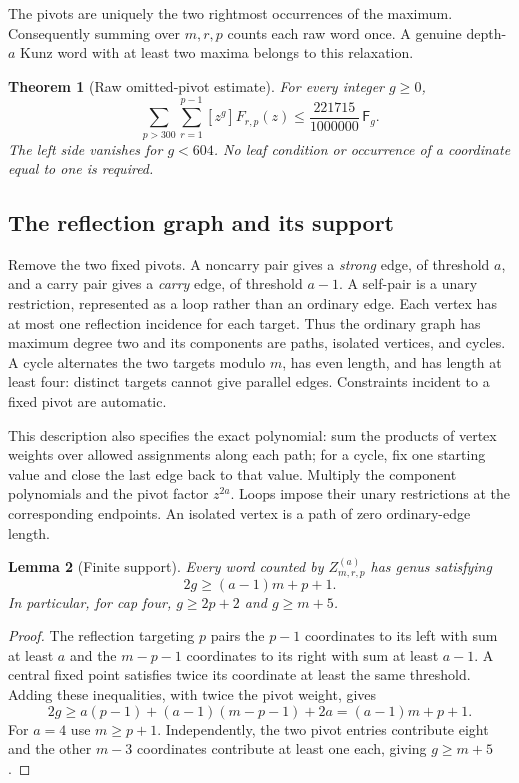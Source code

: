 \documentclass[11pt]{amsart}
\newtheorem{theorem}{Theorem}[section]
\newtheorem{lemma}[theorem]{Lemma}
\theoremstyle{definition}
\theoremstyle{remark}
\newcommand{\Fib}{\mathsf F}
\numberwithin{equation}{section}
\begin{document}
The pivots are uniquely the two rightmost occurrences of the maximum.
Consequently summing over $m,r,p$ counts each raw word once.  A genuine
depth-$a$ Kunz word with at least two maxima belongs to this relaxation.

\begin{theorem}[Raw omitted-pivot estimate]\label{raw:tail}
For every integer $g\ge0$,
\begin{equation}\label{raw:main}
 \sum_{p>300}\sum_{r=1}^{p-1}[z^g]F_{r,p}(z)
 \le \frac{221715}{1000000}\,\Fib_g.
\end{equation}
The left side vanishes for $g<604$.  No leaf condition or occurrence of a
coordinate equal to one is required.
\end{theorem}

\subsection{The reflection graph and its support}

Remove the two fixed pivots.  A noncarry pair gives a \emph{strong} edge,
of threshold $a$, and a carry pair gives a \emph{carry} edge, of threshold
$a-1$.  A self-pair is a unary restriction, represented as a loop rather
than an ordinary edge.  Each vertex has at most one reflection incidence
for each target.  Thus the ordinary graph has maximum degree two and its
components are paths, isolated vertices, and cycles.  A cycle alternates
the two targets modulo $m$, has even length, and has length at least four:
distinct targets cannot give parallel edges.  Constraints incident to a
fixed pivot are automatic.

This description also specifies the exact polynomial: sum the products
of vertex weights over allowed assignments along each path; for a cycle,
fix one starting value and close the last edge back to that value.
Multiply the component polynomials and the pivot factor $z^{2a}$.
Loops impose their unary restrictions at the corresponding endpoints.
An isolated vertex is a path of zero ordinary-edge length.

\begin{lemma}[Finite support]\label{raw:support}
Every word counted by $Z^{(a)}_{m,r,p}$ has genus satisfying
\begin{equation}\label{raw:genus-support}
 2g\ge(a-1)m+p+1.
\end{equation}
In particular, for cap four, $g\ge2p+2$ and $g\ge m+5$.
\end{lemma}
\begin{proof}
The reflection targeting $p$ pairs the $p-1$ coordinates to its left
with sum at least $a$ and the $m-p-1$ coordinates to its right with sum
at least $a-1$.  A central fixed point satisfies twice its coordinate
at least the same threshold.  Adding these inequalities, with twice the
pivot weight, gives
\[
 2g\ge a(p-1)+(a-1)(m-p-1)+2a=(a-1)m+p+1.
\]
For $a=4$ use $m\ge p+1$.  Independently, the two pivot entries contribute
eight and the other $m-3$ coordinates contribute at least one each,
giving $g\ge m+5$.
\end{proof}
\end{document}
